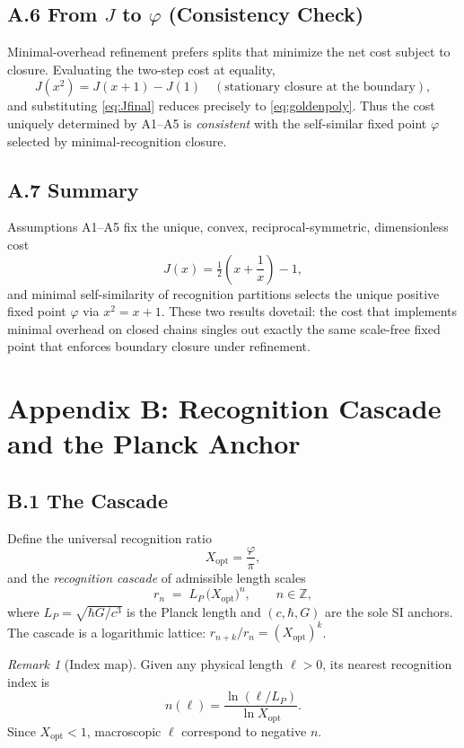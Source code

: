 \documentclass[11pt]{article}
\theoremstyle{definition}
\theoremstyle{remark}
\newtheorem{remark}[theorem]{Remark}
\begin{document}
\subsection*{A.6 From $J$ to $\varphi$ (Consistency Check)}
Minimal-overhead refinement prefers splits that minimize the net cost subject to closure. Evaluating the two-step cost at equality,
\[
J(x^2)=J(x+1)-J(1)\quad(\text{stationary closure at the boundary}),
\]
and substituting \eqref{eq:Jfinal} reduces precisely to \eqref{eq:goldenpoly}. Thus the cost uniquely determined by A1–A5 is \emph{consistent} with the self-similar fixed point $\varphi$ selected by minimal-recognition closure.

\subsection*{A.7 Summary}
Assumptions A1–A5 fix the unique, convex, reciprocal-symmetric, dimensionless cost
\[
J(x)=\tfrac12\!\left(x+\frac{1}{x}\right)-1,
\]
and minimal self-similarity of recognition partitions selects the unique positive fixed point $\varphi$ via $x^2=x+1$. These two results dovetail: the cost that implements minimal overhead on closed chains singles out exactly the same scale-free fixed point that enforces boundary closure under refinement.

\bigskip

\section*{Appendix B: Recognition Cascade and the Planck Anchor}

\subsection*{B.1 The Cascade}
Define the universal recognition ratio
\[
X_{\mathrm{opt}}=\frac{\varphi}{\pi},
\]
and the \emph{recognition cascade} of admissible length scales
\begin{equation}
r_n \;=\; L_P\,\big(X_{\mathrm{opt}}\big)^n,\qquad n\in\mathbb{Z},
\label{eq:cascade}
\end{equation}
where $L_P=\sqrt{\hbar G/c^3}$ is the Planck length and $(c,\hbar,G)$ are the sole SI anchors. The cascade is a logarithmic lattice: $r_{n+k}/r_n=(X_{\mathrm{opt}})^k$.

\begin{remark}[Index map]
Given any physical length $\ell>0$, its nearest recognition index is
\[
n(\ell)=\frac{\ln(\ell/L_P)}{\ln X_{\mathrm{opt}}}.
\]
Since $X_{\mathrm{opt}}<1$, macroscopic $\ell$ correspond to negative $n$.
\end{remark}
\end{document}
